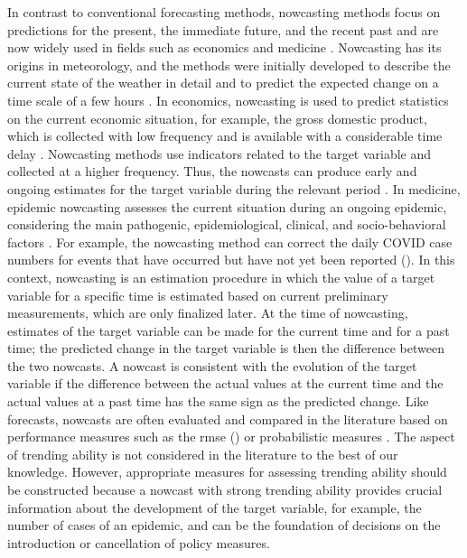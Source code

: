 In contrast to conventional forecasting methods, nowcasting methods focus on predictions for the present, the immediate future, and the recent past \parencite{banbura2013now} and are now widely used in fields such as economics and medicine \parencite{bok2018macroeconomic, Wolffram2023}.
Nowcasting has its origins in meteorology, and the methods were initially developed to describe the current state of the weather in detail and to predict the expected change on a time scale of a few hours \parencite{browning1989nowcasting,schmid2019nowcasting}. 
In economics, nowcasting is used to predict statistics on the current economic situation, for example, the gross domestic product, which is collected with low frequency and is available with a considerable time delay \parencite{banbura2013now}.
Nowcasting methods use indicators related to the target variable and collected at a higher frequency.
Thus, the nowcasts can produce early and ongoing estimates for the target variable during the relevant period \parencite{castle2017forecasting}. 
In medicine, epidemic nowcasting assesses the current situation during an ongoing epidemic, considering the main pathogenic, epidemiological, clinical, and socio-behavioral factors \parencite{wu2021nowcasting}. 
For example, the nowcasting method can correct the daily COVID case numbers for events that have occurred but have not yet been reported (\cite{gunther2021nowcasting}). 
In this context, nowcasting is an estimation procedure in which the value of a target variable for a specific time is estimated based on current preliminary measurements, which are only finalized later. 
At the time of nowcasting, estimates of the target variable can be made for the current time and for a past time; the predicted change in the target variable is then the difference between the two nowcasts. A nowcast is consistent with the evolution of the target variable if the difference between the actual values at the current time and the actual values at a past time has the same sign as the predicted change. Like forecasts, nowcasts are often evaluated and compared in the literature based on performance measures such as the \ac{rmse} (\cite{gunther2021nowcasting}) or probabilistic measures \parencite{Wolffram2023}. The aspect of trending ability is not considered in the literature to the best of our knowledge. However, appropriate measures for assessing trending ability should be constructed because a nowcast with strong trending ability provides crucial information about the development of the target variable, for example, the number of cases of an epidemic, and can be the foundation of decisions on the introduction or cancellation of policy measures.

